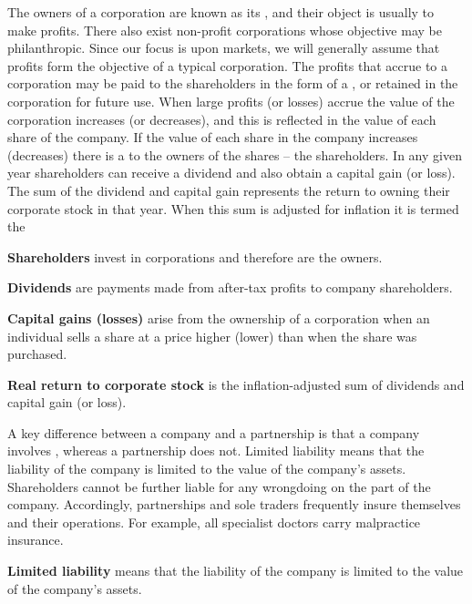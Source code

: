 \newhtmlpage

The owners of a corporation are known as its , and
their object is usually to make profits. There also exist non-profit
corporations whose objective may be philanthropic. Since our focus is upon
markets, we will generally assume that profits form the objective of a
typical corporation. The profits that accrue to a corporation may be paid to
the shareholders in the form of a , or retained in the
corporation for future use. When large profits (or losses) accrue the value
of the corporation increases (or decreases), and this is reflected in the
value of each share of the company. If the value of each share in the
company increases (decreases) there is a 
to the owners of the shares -- the shareholders. In any given year
shareholders can receive a dividend and also obtain a capital gain (or
loss). The sum of the dividend and capital gain represents the return to
owning their corporate stock in that year. When this sum is adjusted for
inflation it is termed the 

\begin{DefBox}
\textbf{Shareholders} invest in corporations and therefore are the owners. 

\textbf{Dividends} are payments made from after-tax profits to company shareholders.

\textbf{Capital gains (losses)} arise from the ownership of a corporation when an individual sells a share at a price higher (lower) than when the share was purchased.

\textbf{Real return to corporate stock} is the inflation-adjusted sum of dividends and capital gain (or loss).
\end{DefBox}

\newhtmlpage

A key difference between a company and a partnership is that a company
involves , whereas a partnership does not.
Limited liability means that the liability of the company is limited to the
value of the company's assets. Shareholders cannot be further liable for any
wrongdoing on the part of the company. Accordingly, partnerships and sole
traders frequently insure themselves and their operations. For example, all
specialist doctors carry malpractice insurance.

\begin{DefBox}
\textbf{Limited liability} means that the liability of the company is limited to the value of the company's assets.
\end{DefBox}

